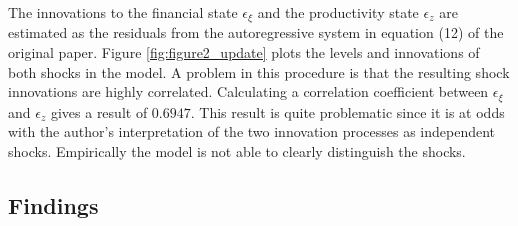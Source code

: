 % 

The innovations to the financial state \(\epsilon_{\xi}\) and the productivity
state \(\epsilon_{z}\) are estimated as the residuals from the autoregressive
system in equation (12) of the original paper. Figure \ref{fig:figure2_update}
plots the levels and innovations of both shocks in the model. A problem in this
procedure is that the resulting shock innovations are highly
correlated. Calculating a correlation coefficient between \(\epsilon_{\xi}\)
and \(\epsilon_z\) gives a result of $0.6947$. This result is
quite problematic since it is at odds with the author's interpretation of the
two innovation processes as independent shocks. Empirically the model is not
able to clearly distinguish the shocks.

%         

\subsection{Findings}
\label{sec:findings}


\blindtext